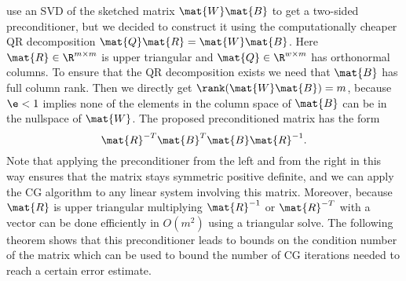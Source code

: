 \Textcite{Avron-FasterRandomizedInfeasibleIPMs} use an SVD of the sketched matrix \(\mat{W}\mat{B}\) to get a two-sided preconditioner, but we decided to construct it using the computationally cheaper QR decomposition \(\mat{Q}\mat{R} = \mat{W}\mat{B}\).
Here \(\mat{R} \in \R^{m \times m}\) is upper triangular and \(\mat{Q} \in \R^{w \times m}\) has orthonormal columns.
To ensure that the QR decomposition exists we need that \(\mat{B}\) has full column rank.
Then we directly get \(\rank(\mat{W}\mat{B}) = m\), because \(\e < 1\) implies none of the elements in the column space of \(\mat{B}\) can be in the nullspace of \(\mat{W}\).
The proposed preconditioned matrix has the form
\begin{equation}\label{eqn:preconditioned-matrix}
 \mat{R}^{-T} \mat{B}^T \mat{B} \mat{R}^{-1}.
\end{equation}
Note that applying the preconditioner from the left and from the right in this way ensures that the matrix stays symmetric positive definite, and we can apply the CG algorithm to any linear system involving this matrix.
Moreover, because \(\mat{R}\) is upper triangular multiplying \(\mat{R}^{-1}\) or \(\mat{R}^{-T}\) with a vector can be done efficiently in \(O(m^2)\) using a triangular solve.
The following theorem shows that this preconditioner leads to bounds on the condition number of the matrix which can be used to bound the number of CG iterations needed to reach a certain error estimate.

